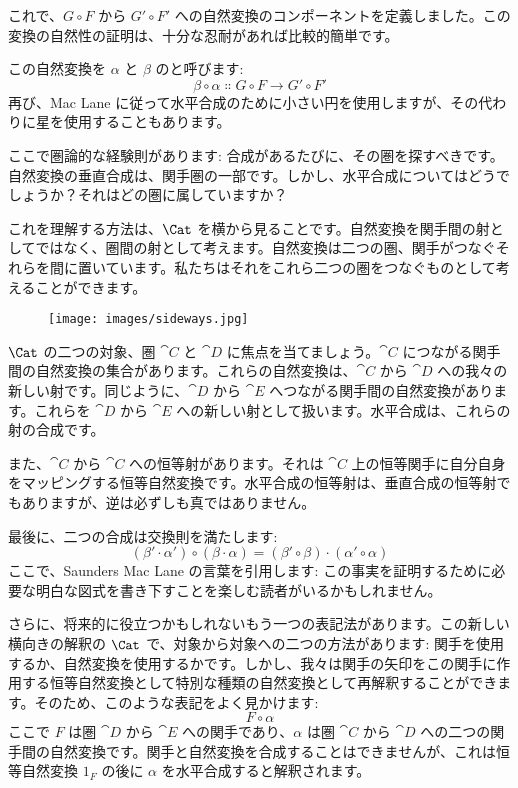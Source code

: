 これで、$G \circ F$ から $G' \circ F'$ への自然変換のコンポーネントを定義しました。この変換の自然性の証明は、十分な忍耐があれば比較的簡単です。

この自然変換を $\alpha$ と $\beta$ のと呼びます: 
\[\beta \circ \alpha \Colon G \circ F \to G' \circ F'\]
再び、Mac Lane に従って水平合成のために小さい円を使用しますが、その代わりに星を使用することもあります。

ここで圏論的な経験則があります: 合成があるたびに、その圏を探すべきです。自然変換の垂直合成は、関手圏の一部です。しかし、水平合成についてはどうでしょうか？それはどの圏に属していますか？

これを理解する方法は、$\Cat$ を横から見ることです。自然変換を関手間の射としてではなく、圏間の射として考えます。自然変換は二つの圏、関手がつなぐそれらを間に置いています。私たちはそれをこれら二つの圏をつなぐものとして考えることができます。

\begin{figure}[H]
  \centering
  \texttt{[image: images/sideways.jpg]}
\end{figure}

\noindent
$\Cat$ の二つの対象、圏 $\cat{C}$ と $\cat{D}$ に焦点を当てましょう。$\cat{C}$ につながる関手間の自然変換の集合があります。これらの自然変換は、$\cat{C}$ から $\cat{D}$ への我々の新しい射です。同じように、$\cat{D}$ から $\cat{E}$ へつながる関手間の自然変換があります。これらを $\cat{D}$ から $\cat{E}$ への新しい射として扱います。水平合成は、これらの射の合成です。

また、$\cat{C}$ から $\cat{C}$ への恒等射があります。それは $\cat{C}$ 上の恒等関手に自分自身をマッピングする恒等自然変換です。水平合成の恒等射は、垂直合成の恒等射でもありますが、逆は必ずしも真ではありません。

最後に、二つの合成は交換則を満たします: 
\[(\beta' \cdot \alpha') \circ (\beta \cdot \alpha) = (\beta' \circ \beta) \cdot (\alpha' \circ \alpha)\]
ここで、Saunders Mac Lane の言葉を引用します: この事実を証明するために必要な明白な図式を書き下すことを楽しむ読者がいるかもしれません。

さらに、将来的に役立つかもしれないもう一つの表記法があります。この新しい横向きの解釈の $\Cat$ で、対象から対象への二つの方法があります: 関手を使用するか、自然変換を使用するかです。しかし、我々は関手の矢印をこの関手に作用する恒等自然変換として特別な種類の自然変換として再解釈することができます。そのため、このような表記をよく見かけます: 
\[F \circ \alpha\]
ここで $F$ は圏 $\cat{D}$ から $\cat{E}$ への関手であり、$\alpha$ は圏 $\cat{C}$ から $\cat{D}$ への二つの関手間の自然変換です。関手と自然変換を合成することはできませんが、これは恒等自然変換 $1_F$ の後に $\alpha$ を水平合成すると解釈されます。

